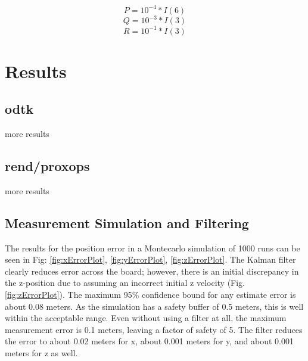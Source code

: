 \documentclass[]{aiaa-tc}%
\begin{document}
\begin{equation}
P = 10^{-4}*I(6)
\end{equation}
\begin{equation}
Q = 10^{-3}*I(3)
\end{equation}
\begin{equation}
R = 10^{-1}*I(3)
\end{equation}
  
  
\section{Results}


\subsection{odtk}

more results

\subsection{rend/proxops}

more results

\subsection{Measurement Simulation and Filtering}
The results for the position error in a Montecarlo simulation of 1000 runs can be seen in Fig:
\ref{fig:xErrorPlot},
\ref{fig:yErrorPlot}, 
\ref{fig:zErrorPlot}.  
The Kalman filter clearly reduces error across the board; however, there is an initial discrepancy in the z-position due to assuming an incorrect initial z velocity (Fig. \ref{fig:zErrorPlot}).  The maximum 95\% confidence bound for any estimate error is about 0.08 meters.  As the simulation has a safety buffer of 0.5 meters, this is well within the acceptable range.  Even without using a filter at all, the maximum measurement error is 0.1 meters, leaving a factor of safety of 5.  The filter reduces the error to about 0.02 meters for x, about 0.001 meters for y, and about 0.001 meters for z as well. 
\end{document}
